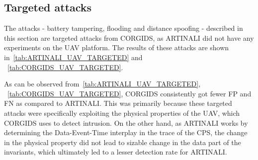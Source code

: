\subsection{Targeted attacks}
The attacks - battery tampering, flooding and distance spoofing - described in this section are targeted attacks from \ac{CORGIDS}, as ARTINALI did not have any experiments on the \ac{UAV} platform.
The results of these attacks are shown in~\autoref{tab:ARTINALI_UAV_TARGETED} and ~\autoref{tab:CORGIDS_UAV_TARGETED}.

\begin{table}
\centering
  \caption{Results of intrusion detection by ARTINALI for Targeted attacks on \ac{UAV} platform}
  \label{tab:ARTINALI_UAV_TARGETED}
\end{table}

\begin{table}
\centering
  \caption{Results of intrusion detection by \ac{CORGIDS} for Targeted attacks on \ac{UAV} platform}
  \label{tab:CORGIDS_UAV_TARGETED}
\end{table}

As can be observed from~\autoref{tab:ARTINALI_UAV_TARGETED}, ~\autoref{tab:CORGIDS_UAV_TARGETED}, \ac{CORGIDS} consistently got fewer \ac{FP} and \ac{FN} as compared to ARTINALI. This was primarily because these targeted attacks were specifically exploiting the physical properties of the \ac{UAV}, which \ac{CORGIDS} uses to detect intrusion. On the other hand, as ARTINALI works by determining the Data-Event-Time interplay in the trace of the \ac{CPS}, the change in the physical property did not lead to sizable change in the data part of the invariants, which ultimately led to a lesser detection rate for ARTINALI.

